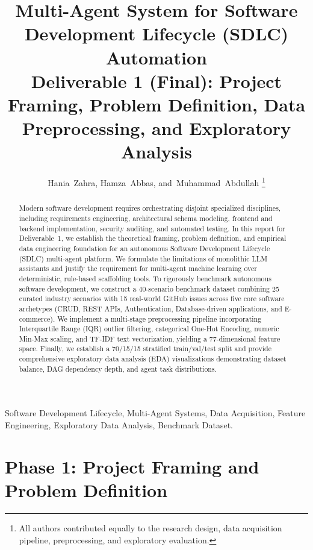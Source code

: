 \documentclass[10pt,journal,compsoc]{IEEEtran}
\title{Multi-Agent System for Software Development Lifecycle (SDLC) Automation\\
\large Deliverable 1 (Final): Project Framing, Problem Definition, Data Preprocessing, and Exploratory Analysis}
\author{Hania~Zahra,
        Hamza~Abbas,
        and~Muhammad~Abdullah%
\thanks{All authors contributed equally to the research design, data acquisition pipeline, preprocessing, and exploratory evaluation.}
}
\begin{document}
\maketitle

\begin{abstract}
Modern software development requires orchestrating disjoint specialized disciplines, including requirements engineering, architectural schema modeling, frontend and backend implementation, security auditing, and automated testing. In this report for Deliverable~1, we establish the theoretical framing, problem definition, and empirical data engineering foundation for an autonomous Software Development Lifecycle (SDLC) multi-agent platform. We formulate the limitations of monolithic LLM assistants and justify the requirement for multi-agent machine learning over deterministic, rule-based scaffolding tools. To rigorously benchmark autonomous software development, we construct a 40-scenario benchmark dataset combining 25 curated industry scenarios with 15 real-world GitHub issues across five core software archetypes (CRUD, REST APIs, Authentication, Database-driven applications, and E-commerce). We implement a multi-stage preprocessing pipeline incorporating Interquartile Range (IQR) outlier filtering, categorical One-Hot Encoding, numeric Min-Max scaling, and TF-IDF text vectorization, yielding a 77-dimensional feature space. Finally, we establish a 70/15/15 stratified train/val/test split and provide comprehensive exploratory data analysis (EDA) visualizations demonstrating dataset balance, DAG dependency depth, and agent task distributions.
\end{abstract}

\begin{IEEEkeywords}
Software Development Lifecycle, Multi-Agent Systems, Data Acquisition, Feature Engineering, Exploratory Data Analysis, Benchmark Dataset.
\end{IEEEkeywords}

\section{Phase 1: Project Framing and Problem Definition}
\end{document}

